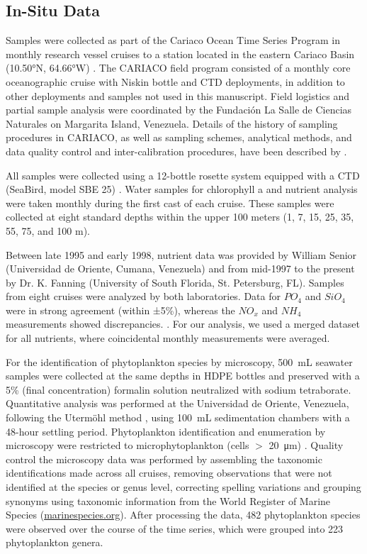 \documentclass[draft]{agujournal2019}
\begin{document}
\subsection{In-Situ Data}
    Samples were collected as part of the Cariaco Ocean Time Series Program in monthly research vessel cruises to a station located in the eastern Cariaco Basin (\ang{10.50}N, \ang{64.66}W) \cite{muller-karger_scientific_2019}.
    The CARIACO field program consisted of a monthly core oceanographic cruise with Niskin bottle and CTD deployments, in addition to other deployments and samples not used in this manuscript. Field logistics and partial sample analysis were coordinated by the Fundación La Salle de Ciencias Naturales on Margarita Island, Venezuela. Details of the history of sampling procedures in CARIACO, as well as sampling schemes, analytical methods, and data quality control and inter-calibration procedures, have been described by . 
    
    All samples were collected using a 12-bottle rosette system equipped with a CTD (SeaBird, model SBE 25) \cite{astor_yrene_m_handbook_2013}. Water samples for chlorophyll a and nutrient analysis were taken monthly during the first cast of each cruise. These samples were collected at eight standard depths within the upper 100 meters (1, 7, 15, 25, 35, 55, 75, and 100 m). 

    
    Between late 1995 and early 1998, nutrient data was provided by William Senior (Universidad de Oriente, Cumana, Venezuela) and from mid-1997 to the present by Dr. K. Fanning (University of South Florida, St. Petersburg, FL). Samples from eight cruises were analyzed by both laboratories. Data for $PO_4$ and $SiO_4$ were in strong agreement (within ±5\%), whereas the $NO_x$ and $NH_4$ measurements showed discrepancies. \cite{taylor_ecosystem_2012}. For our analysis, we used a merged dataset for all nutrients, where coincidental monthly measurements were averaged.
       
    For the identification of phytoplankton species by microscopy, \qty{500}{\milli\liter} seawater samples were collected at the same depths in HDPE bottles and preserved with a 5\% (final concentration) formalin solution neutralized with sodium tetraborate. Quantitative analysis was performed at the Universidad de Oriente, Venezuela, following the Utermöhl method \cite{hasle1978inverted}, using \qty{100}{\milli\liter} sedimentation chambers with a 48-hour settling period. Phytoplankton identification and enumeration by microscopy were restricted to microphytoplankton (cells $>$ \qty{20}{\micro \meter}) \cite{mutshinda_environmental_2013}.
    Quality control the microscopy data was performed by assembling the taxonomic identifications made across all cruises, removing observations that were not identified at the species or genus level, correcting spelling variations and grouping synonyms using taxonomic information from the World Register of Marine Species (\url{marinespecies.org}). After processing the data, 482 phytoplankton species were observed over the course of the time series, which were grouped into 223 phytoplankton genera.
\end{document}
